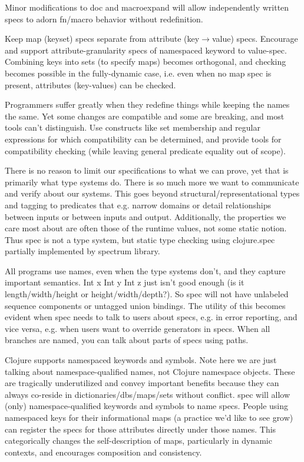 Minor modifications to doc and macroexpand will allow independently written
specs to adorn fn/macro behavior without redefinition.

Keep map (keyset) specs separate from attribute (key$\rightarrow$value) specs.
Encourage and support attribute-granularity specs of namespaced keyword to
value-spec. Combining keys into sets (to specify maps) becomes orthogonal, and
checking becomes possible in the fully-dynamic case, i.e. even when no map spec
is present, attributes (key-values) can be checked.

Programmers suffer greatly when they redefine things while keeping the names the
same. Yet some changes are compatible and some are breaking, and most tools
can’t distinguish. Use constructs like set membership and regular expressions
for which compatibility can be determined, and provide tools for compatibility
checking (while leaving general predicate equality out of scope).

There is no reason to limit our specifications to what we can prove, yet that is
primarily what type systems do. There is so much more we want to communicate and
verify about our systems. This goes beyond structural/representational types and
tagging to predicates that e.g. narrow domains or detail relationships between
inputs or between inputs and output. Additionally, the properties we care most
about are often those of the runtime values, not some static notion. Thus spec
is not a type system, but static type checking using clojure.spec partially
implemented by spectrum library.


All programs use names, even when the type systems don’t, and they capture
important semantics. Int x Int y Int z just isn’t good enough (is it
length/width/height or height/width/depth?). So spec will not have unlabeled
sequence components or untagged union bindings. The utility of this becomes
evident when spec needs to talk to users about specs, e.g. in error reporting,
and vice versa, e.g. when users want to override generators in specs. When all
branches are named, you can talk about parts of specs using paths.

Clojure supports namespaced keywords and symbols. Note here we are just talking
about namespace-qualified names, not Clojure namespace objects. These are
tragically underutilized and convey important benefits because they can always
co-reside in dictionaries/dbs/maps/sets without conflict. spec will allow (only)
namespace-qualified keywords and symbols to name specs. People using namespaced
keys for their informational maps (a practice we’d like to see grow) can
register the specs for those attributes directly under those names. This
categorically changes the self-description of maps, particularly in dynamic
contexts, and encourages composition and consistency.

